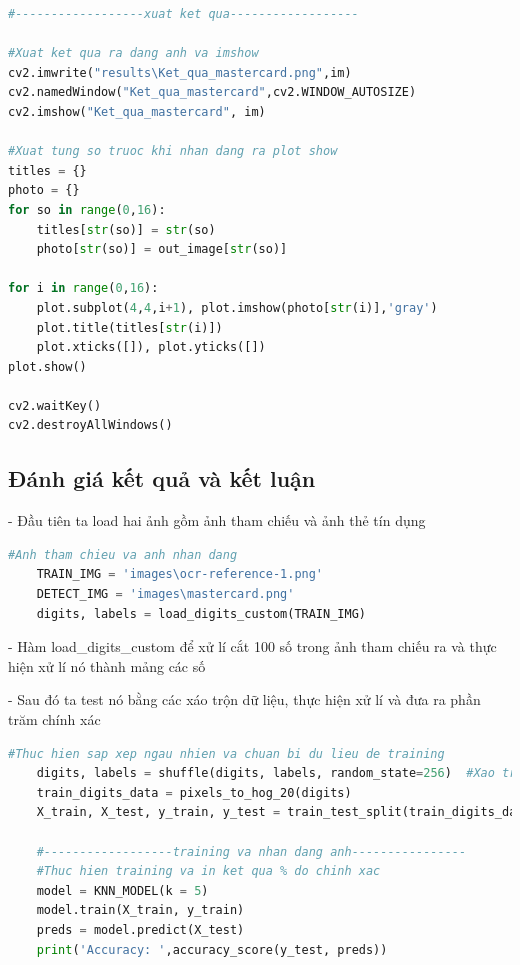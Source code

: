 \begin{lstlisting}[language=Python, caption=Recognition Mastercard]
#------------------xuat ket qua------------------

#Xuat ket qua ra dang anh va imshow
cv2.imwrite("results\Ket_qua_mastercard.png",im)
cv2.namedWindow("Ket_qua_mastercard",cv2.WINDOW_AUTOSIZE)
cv2.imshow("Ket_qua_mastercard", im)

#Xuat tung so truoc khi nhan dang ra plot show
titles = {}
photo = {}
for so in range(0,16):		
    titles[str(so)] = str(so)
    photo[str(so)] = out_image[str(so)]

for i in range(0,16):
	plot.subplot(4,4,i+1), plot.imshow(photo[str(i)],'gray')
	plot.title(titles[str(i)])
	plot.xticks([]), plot.yticks([])
plot.show()
    
cv2.waitKey() 
cv2.destroyAllWindows()          


\end{lstlisting}

\subsection{Đánh giá kết quả và kết luận}

- Đầu tiên ta load hai ảnh gồm ảnh tham chiếu và ảnh thẻ tín dụng
\begin{lstlisting}[language=Python]
    #Anh tham chieu va anh nhan dang
    TRAIN_IMG = 'images\ocr-reference-1.png'
    DETECT_IMG = 'images\mastercard.png'
    digits, labels = load_digits_custom(TRAIN_IMG)
\end{lstlisting}

- Hàm load\_digits\_custom để xử lí cắt 100 số trong ảnh tham chiếu ra và thực hiện xử lí nó thành mảng các số

- Sau đó ta test nó bằng các xáo trộn dữ liệu, thực hiện xử lí và đưa ra phần trăm chính xác

\begin{lstlisting}[language=Python]
    #Thuc hien sap xep ngau nhien va chuan bi du lieu de training
    digits, labels = shuffle(digits, labels, random_state=256)  #Xao tron du lieu
    train_digits_data = pixels_to_hog_20(digits)
    X_train, X_test, y_train, y_test = train_test_split(train_digits_data, labels, test_size=0.7)

    #------------------training va nhan dang anh----------------
    #Thuc hien training va in ket qua % do chinh xac
    model = KNN_MODEL(k = 5)
    model.train(X_train, y_train)
    preds = model.predict(X_test)
    print('Accuracy: ',accuracy_score(y_test, preds))
\end{lstlisting}

